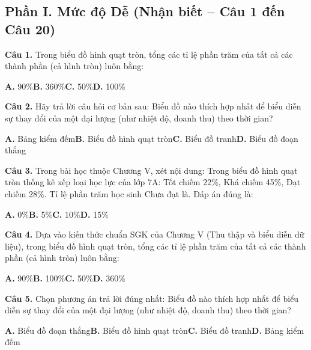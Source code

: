 \documentclass[11pt,a4paper]{article}
\begin{document}
\subsection*{\color{accent} Phần I. Mức độ Dễ (Nhận biết -- Câu 1 đến Câu 20)}
\textbf{\color{primary} Câu 1.} Trong biểu đồ hình quạt tròn, tổng các tỉ lệ phần trăm của tất cả các thành phần (cả hình tròn) luôn bằng:\par
\hspace*{1.5em}\textbf{A.} 90\%\quad\quad \textbf{B.} 360\%\quad\quad \textbf{C.} 50\%\quad\quad \textbf{D.} 100\%\par\vspace{2pt}
\textbf{\color{primary} Câu 2.} Hãy trả lời câu hỏi cơ bản sau: Biểu đồ nào thích hợp nhất để biểu diễn sự thay đổi của một đại lượng (như nhiệt độ, doanh thu) theo thời gian?\par
\hspace*{1.5em}\textbf{A.} Bảng kiểm đếm\quad\quad \textbf{B.} Biểu đồ hình quạt tròn\quad\quad \textbf{C.} Biểu đồ tranh\quad\quad \textbf{D.} Biểu đồ đoạn thẳng\par\vspace{2pt}
\textbf{\color{primary} Câu 3.} Trong bài học thuộc Chương V, xét nội dung: Trong biểu đồ hình quạt tròn thống kê xếp loại học lực của lớp 7A: Tốt chiếm 22\%, Khá chiếm 45\%, Đạt chiếm 28\%. Tỉ lệ phần trăm học sinh Chưa đạt là. Đáp án đúng là:\par
\hspace*{1.5em}\textbf{A.} 0\%\quad\quad \textbf{B.} 5\%\quad\quad \textbf{C.} 10\%\quad\quad \textbf{D.} 15\%\par\vspace{2pt}
\textbf{\color{primary} Câu 4.} Dựa vào kiến thức chuẩn SGK của Chương V (Thu thập và biểu diễn dữ liệu), trong biểu đồ hình quạt tròn, tổng các tỉ lệ phần trăm của tất cả các thành phần (cả hình tròn) luôn bằng:\par
\hspace*{1.5em}\textbf{A.} 90\%\quad\quad \textbf{B.} 100\%\quad\quad \textbf{C.} 50\%\quad\quad \textbf{D.} 360\%\par\vspace{2pt}
\textbf{\color{primary} Câu 5.} Chọn phương án trả lời đúng nhất: Biểu đồ nào thích hợp nhất để biểu diễn sự thay đổi của một đại lượng (như nhiệt độ, doanh thu) theo thời gian?\par
\hspace*{1.5em}\textbf{A.} Biểu đồ đoạn thẳng\quad\quad \textbf{B.} Biểu đồ hình quạt tròn\quad\quad \textbf{C.} Biểu đồ tranh\quad\quad \textbf{D.} Bảng kiểm đếm\par\vspace{2pt}
\end{document}
